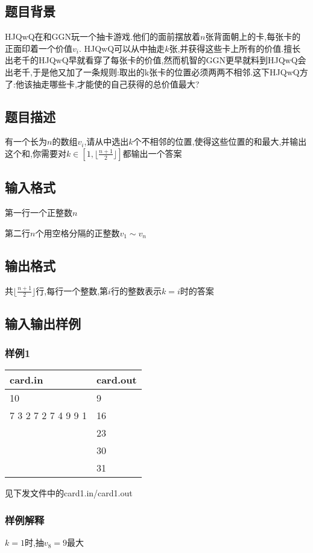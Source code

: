 \documentclass[12pt]{ctexart}
\begin{document}
\subsection{题目背景}
HJQwQ在和GGN玩一个抽卡游戏.他们的面前摆放着$n$张背面朝上的卡,每张卡的正面印着一个价值$v_i$. HJQwQ可以从中抽走$k$张,并获得这些卡上所有的价值.擅长出老千的HJQwQ早就看穿了每张卡的价值,然而机智的GGN更早就料到HJQwQ会出老千,于是他又加了一条规则:取出的k张卡的位置必须两两不相邻.这下HJQwQ方了:他该抽走哪些卡,才能使的自己获得的总价值最大?
\subsection{题目描述}
有一个长为$n$的数组$v_i$,请从中选出$k$个不相邻的位置,使得这些位置的和最大,并输出这个和,你需要对$k\in\left[1,\lfloor\frac{n+1}{2}\rfloor\right]$都输出一个答案
\subsection{输入格式}
第一行一个正整数$n$

第二行$n$个用空格分隔的正整数$v_1\sim v_n$
\subsection{输出格式}
共$\lfloor\frac{n+1}{2}\rfloor$行,每行一个整数,第$i$行的整数表示$k=i$时的答案
\subsection{输入输出样例}
\subsubsection{样例1}
\begin{center}
	\begin{tabular}{|p{6cm}|p{6cm}|}
		\hline card.in&card.out\\
		\hline	10&9\\
				7 3 2 7 2 7 4 9 9 1&16\\
				&23\\
				&30\\
				&31\\
		\hline
	\end{tabular}
\end{center}
见下发文件中的card1.in/card1.out
\subsubsection{样例解释}
$k=1$时,抽$v_8=9$最大
\end{document}
